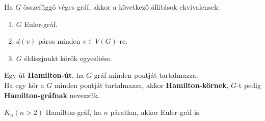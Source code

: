 \documentclass{beamer}
\newcommand{\mmedskip}{\vspace{0.5em}}
\begin{document}
\begin{frame}
\begin{tcolorbox}[title={Tétel: Euler gráfok}]
Ha $G$ összefüggő véges gráf, akkor a következő állítások ekvivalensek:\\
\begin{enumerate}
\item $G$ Euler-gráf.
\item $d(v)$ páros minden $v \in V(G)$-re.
\item $G$ éldiszjunkt körök egyesítése.
\end{enumerate}
\end{tcolorbox}
\end{frame}

\begin{frame}
\begin{tcolorbox}[title={Def.: Hamilton gráfok}]
Egy út \textbf{Hamilton-út}, ha $G$ gráf minden pontját tartalmazza.\\
\mmedskip
Ha egy kör a $G$ minden pontját tartalmazza, akkor \textbf{Hamilton-körnek}, $G$-t pedig \textbf{Hamilton-gráfnak} nevezzük.
\end{tcolorbox}

\begin{tcolorbox}[title={Ész}]
$K_n(n > 2)$ Hamilton-gráf, ha $n$ páratlan, akkor Euler-gráf is.
\end{tcolorbox}



\begin{tcolorbox}[title={Példák}]
\begin{tcbposter}[
poster = {height=7cm,spacing=2mm,rows=3},
boxes = {colframe=mybg, colback=mybg},
]





\end{tcbposter}
\end{tcolorbox}
\end{frame}
\end{document}
